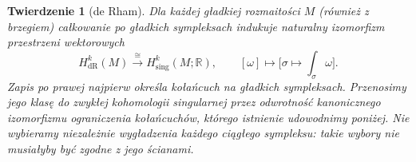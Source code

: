 \documentclass[11pt,a4paper,oneside]{report}
\newcommand{\R}{\mathbb{R}}
\theoremstyle{plain}
\newtheorem{twierdzenie}{Twierdzenie}[section]
\theoremstyle{definition}
\theoremstyle{remark}
\begin{document}
\begin{twierdzenie}[de Rham]
\label{thm:de-rham}
Dla każdej gładkiej rozmaitości $M$ (również z brzegiem)
całkowanie po gładkich sympleksach indukuje naturalny
izomorfizm przestrzeni wektorowych
\begin{equation}\label{eq:de-rham-iso}
 H^k_{\mathrm{dR}}(M)\xrightarrow{\ \cong\ }
 H^k_{\mathrm{sing}}(M;\R),
 \qquad [\omega]\longmapsto
 \bigl[\sigma\longmapsto\textstyle\int_\sigma\omega\bigr].
\end{equation}
Zapis po prawej najpierw określa kołańcuch na
\emph{gładkich} sympleksach. Przenosimy jego klasę do
zwykłej kohomologii singularnej przez odwrotność
kanonicznego izomorfizmu ograniczenia kołańcuchów,
którego istnienie udowodnimy poniżej. Nie wybieramy
niezależnie wygładzenia każdego ciągłego sympleksu:
takie wybory nie musiałyby być zgodne z jego ścianami.
\end{twierdzenie}
\end{document}
